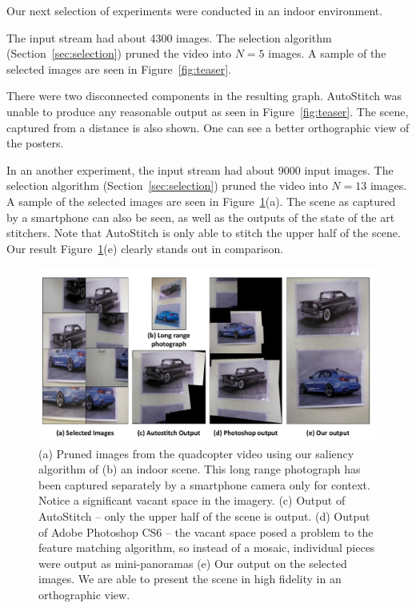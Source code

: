 Our next selection of experiments were conducted in an indoor
environment.  

The input stream had about 4300
images. The selection algorithm (Section~\ref{sec:selection}) pruned the video
into $N=5$ images. A sample of the selected images are seen in Figure~\ref{fig:teaser}.

There were two disconnected components in the resulting graph.
AutoStitch was unable to produce any reasonable output as seen in
Figure~\ref{fig:teaser}.  The scene, captured from a distance is also
shown.  One can see a better orthographic view of the posters.

In an another experiment, the input stream had about 9000 input
images.  The selection algorithm (Section~\ref{sec:selection}) pruned
the video into $N=13$ images. A sample of the selected images are seen
in Figure~\ref{fig:indoor_results}(a).  The scene as captured by a
smartphone can also be seen, as well as the outputs of the state of
the art stitchers. Note that AutoStitch is only able to stitch the
upper half of the scene.  Our result
Figure~\ref{fig:indoor_results}(e) clearly stands out in comparison.

\begin{figure}
\centering
\includegraphics[width=\linewidth]{figures/vacantSpaces/indoor_results}
\caption[Result: Cars]{ (a) Pruned images from the quadcopter video using our
  saliency algorithm of (b) an indoor scene. This long range photograph
  has been captured separately by a smartphone camera only for
  context. Notice a significant vacant space in the imagery.  (c)
  Output of AutoStitch -- only the upper half of the scene is output.
  (d) Output of Adobe Photoshop CS6 -- the vacant space posed a problem to the
  feature matching algorithm, so instead of a mosaic, individual
  pieces were output as mini-panoramas (e) Our output on the selected
  images. We are able to present the scene in high fidelity in an
  orthographic view.}
\label{fig:indoor_results}
\end{figure}

